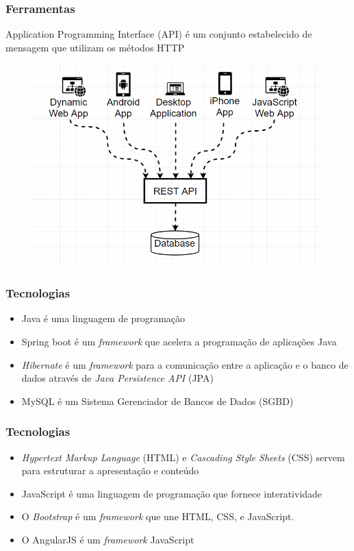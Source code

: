 \documentclass{beamer}
\begin{document}
	\begin{frame}\frametitle{Ferramentas}
		Application Programming Interface (API) é um conjunto estabelecido de mensagem que utilizam os métodos HTTP
			\begin{figure}[ht]
				\centering
				\includegraphics[scale=0.3]{img/rest_api.png}
			\end{figure}
	\end{frame}

	\begin{frame}\frametitle{Tecnologias}
		\begin{itemize}
			\item Java é uma linguagem de programação
			\item Spring boot é um \textit{framework} que acelera a programação de aplicações Java
			\item \textit{Hibernate} é um \textit{framework} para a comunicação entre a aplicação e o banco de dados através de \textit{Java Persistence API} (JPA)
			\item MySQL é um Sistema Gerenciador de Bancos de Dados (SGBD)
		\end{itemize}
	\end{frame}

	\begin{frame}\frametitle{Tecnologias}
		\begin{itemize}
			\item \textit{Hypertext Markup Language} (HTML) e \textit{Cascading Style Sheets} (CSS) servem para estruturar a apresentação e conteúdo

			\item JavaScript é uma linguagem de programação que fornece interatividade
			\item O \textit{Bootstrap} é um \textit{framework} que une HTML, CSS, e JavaScript.
			\item O AngularJS é um \textit{framework} JavaScript 
		\end{itemize}
	\end{frame}
\end{document}
